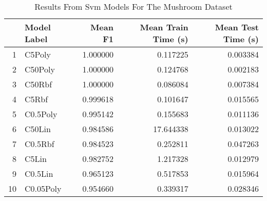 \begin{table}[!htbp]
\centering
\caption{Results From Svm Models For The Mushroom Dataset}
\label{tab:svm_results_mushroom}
\begin{tabular}{rlrrr}
\toprule
 & Model Label & Mean F1 & Mean Train Time (s) & Mean Test Time (s) \\
\midrule
1 & C5Poly & 1.000000 & 0.117225 & 0.003384 \\
2 & C50Poly & 1.000000 & 0.124768 & 0.002183 \\
3 & C50Rbf & 1.000000 & 0.086084 & 0.007384 \\
4 & C5Rbf & 0.999618 & 0.101647 & 0.015565 \\
5 & C0.5Poly & 0.995142 & 0.155683 & 0.011136 \\
6 & C50Lin & 0.984586 & 17.644338 & 0.013022 \\
7 & C0.5Rbf & 0.984523 & 0.252811 & 0.047263 \\
8 & C5Lin & 0.982752 & 1.217328 & 0.012979 \\
9 & C0.5Lin & 0.965123 & 0.517853 & 0.015964 \\
10 & C0.05Poly & 0.954660 & 0.339317 & 0.028346 \\
\bottomrule
\end{tabular}
\end{table}
